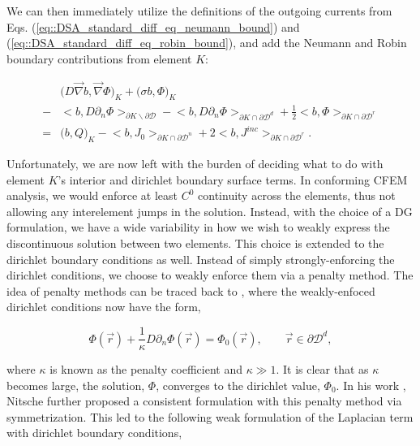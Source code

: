 \noindent We can then immediately utilize the definitions of the outgoing currents from Eqs. (\ref{eq::DSA_standard_diff_eq_neumann_bound}) and (\ref{eq::DSA_standard_diff_eq_robin_bound}), and add the Neumann and Robin boundary contributions from element $K$:

\begin{equation}
\label{eq::SIP_diff_eq_weak_cellK_NR}
\begin{aligned}
&\Big(  D \vec{\nabla}  b , \vec{\nabla} \Phi  \Big)_{K}  + \Big(  \sigma   b ,  \Phi  \Big)_{K}  \\
- &\Big<  b, D \partial_n \Phi \Big>_{\partial K \backslash \partial \mathcal{D}} - \Big<  b, D \partial_n \Phi \Big>_{\partial	K \cap \partial \mathcal{D}^d}+ \frac{1}{2} \Big<  b, \Phi  \Big>_{\partial K \cap \partial \mathcal{D}^r} \\
= &\Big(  b, Q  \Big)_{K} - \Big<   b, J_{0}  \Big>_{\partial K \cap \partial \mathcal{D}^n} +  2 \Big<  b, J^{inc}  \Big>_{\partial	K \cap \partial \mathcal{D}^r}.
\end{aligned}
\end{equation}

Unfortunately, we are now left with the burden of deciding what to do with element $K$'s interior and dirichlet boundary surface terms. In conforming CFEM analysis, we would enforce at least $C^0$ continuity across the elements, thus not allowing any interelement jumps in the solution. Instead, with the choice of a DG formulation, we have a wide variability in how we wish to weakly express the discontinuous solution between two elements. This choice is extended to the dirichlet boundary conditions as well. Instead of simply strongly-enforcing the dirichlet conditions, we choose to weakly enforce them via a penalty method. The idea of penalty methods can be traced back to \cite{lions2011problemes}, where the weakly-enfoced dirichlet conditions now have the form,

\begin{equation}
\label{eq::penalty_boundary_term}
\Phi (\vec{r}) +\frac{1}{\kappa} D \partial_n \Phi (\vec{r}) = \Phi_0 (\vec{r}), \qquad \vec{r} \in \partial \mathcal{D}^d, 
\end{equation}

\noindent where $\kappa$ is known as the penalty coefficient and $\kappa \gg 1$. It is clear that as $\kappa$ becomes large, the solution, $\Phi$, converges to the dirichlet value, $\Phi_0$. In his work \cite{ref::nitsche_IP}, Nitsche further proposed a consistent formulation with this penalty method via symmetrization. This led to the following weak formulation of the Laplacian term with dirichlet boundary conditions,

